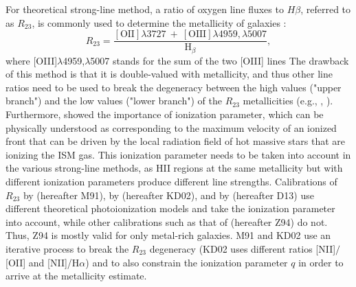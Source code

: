 \documentclass{emulateapj}
\newcommand{\ha}{H$\alpha$}
\begin{document}
For theoretical strong-line method, a ratio of oxygen line fluxes to $H\beta$, referred to as $R_{23}$, is commonly used to determine the metallicity of galaxies  \citep{pagel79}:
$$R_{23}=\frac{\mathrm{[OII]} \lambda 3727~+~\mathrm{[OIII]} \lambda 4959,\lambda 5007}{\mathrm{H}_\beta},$$ 
where [OIII]$\lambda$4959,$\lambda$5007 stands for the sum of the two [OIII] lines
 The drawback of this method is that it is double-valued with metallicity, and thus other line ratios need to be used to break the degeneracy between the high values ("upper branch") and the low values ("lower branch") of the $R_{23}$ metallicities (e.g., \citealt{kewley08},  \citealt{moustakas10}). 
Furthermore, \citet{kewley02} showed the importance of ionization parameter, which can be physically understood as corresponding to the maximum velocity of an ionized front that can be driven by the local radiation field of hot massive stars that are ionizing the ISM gas. This ionization parameter needs to be taken into account in the various strong-line methods, as HII regions at the same metallicity but with different ionization parameters produce different line strengths. Calibrations of $R_{23}$ by \citet{mcgaugh91} (hereafter M91), by \citet{kewley02} (hereafter KD02), and by \citet{dopita13} (hereafter D13) use different theoretical photoionization models and take the ionization parameter into account, while other calibrations such as that of \citet{zaritsky94} (hereafter Z94) do not. Thus, Z94 is mostly valid for only metal-rich galaxies.  M91 and KD02 use an iterative process to break the $R_{23}$ degeneracy  (KD02 uses different ratios [NII]$/$[OII] and [NII]/\ha) and to also constrain the ionization parameter $q$ in order to arrive at the metallicity estimate.
\end{document}
